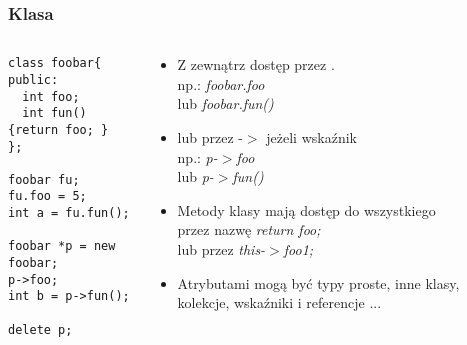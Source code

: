 \documentclass[10pt]{beamer}
\begin{document}
\begin{frame}[fragile]
  \frametitle{Klasa}
  \begin{columns}
    \begin{column}{0.48\textwidth}
\begin{lstlisting}
class foobar{
public:
  int foo;
  int fun(){return foo; }
};

foobar fu;
fu.foo = 5;
int a = fu.fun();

foobar *p = new foobar;
p->foo;
int b = p->fun();

delete p;

\end{lstlisting}
    \end{column}
    \begin{column}{0.48\textwidth}
      \begin{itemize}
        \item Z zewnątrz dostęp przez .\\
        np.: \textit{foobar.foo}\\
        lub \textit{foobar.fun()}
        \item lub przez -$>$ jeżeli wskaźnik\\
        np.: \textit{p-{$>$}foo}\\
        lub \textit{p-{$>$}fun()}
        \item Metody klasy mają dostęp do wszystkiego\\
        przez nazwę \textit{return foo;}\\
        lub przez \textit{this-{$>$}foo1;}
        \item Atrybutami mogą być typy proste, inne klasy, kolekcje, wskaźniki i referencje ...
      \end{itemize}
    \end{column}
  \end{columns}
\end{frame}
\end{document}
